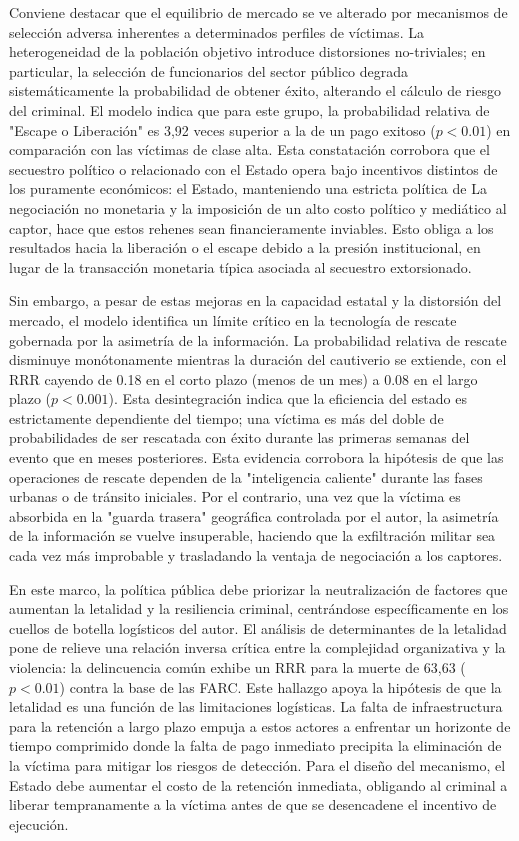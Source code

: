 \documentclass[12pt]{article}
\theoremstyle{definition}
\theoremstyle{remark}
\newcommand{\1}{\mathbf{1}}
\begin{document}
Conviene destacar que el equilibrio de mercado se ve alterado por mecanismos de selección adversa inherentes a determinados perfiles de víctimas. La heterogeneidad de la población objetivo introduce distorsiones no-triviales; en particular, la selección de funcionarios del sector público degrada sistemáticamente la probabilidad de obtener éxito, alterando el cálculo de riesgo del criminal. El modelo indica que para este grupo, la probabilidad relativa de "Escape o Liberación" es 3,92 veces superior a la de un pago exitoso ($p<0.01$) en comparación con las víctimas de clase alta. Esta constatación corrobora que el secuestro político o relacionado con el Estado opera bajo incentivos distintos de los puramente económicos: el Estado, manteniendo una estricta política de La negociación no monetaria y la imposición de un alto costo político y mediático al captor, hace que estos rehenes sean financieramente inviables. Esto obliga a los resultados hacia la liberación o el escape debido a la presión institucional, en lugar de la transacción monetaria típica asociada al secuestro extorsionado.

Sin embargo, a pesar de estas mejoras en la capacidad estatal y la distorsión del mercado, el modelo identifica un límite crítico en la tecnología de rescate gobernada por la asimetría de la información. La probabilidad relativa de rescate disminuye monótonamente mientras la duración del cautiverio se extiende, con el RRR cayendo de 0.18 en el corto plazo (menos de un mes) a 0.08 en el largo plazo ($p<0.001$). Esta desintegración indica que la eficiencia del estado es estrictamente dependiente del tiempo; una víctima es más del doble de probabilidades de ser rescatada con éxito durante las primeras semanas del evento que en meses posteriores. Esta evidencia corrobora la hipótesis de que las operaciones de rescate dependen de la "inteligencia caliente" durante las fases urbanas o de tránsito iniciales. Por el contrario, una vez que la víctima es absorbida en la "guarda trasera" geográfica controlada por el autor, la asimetría de la información se vuelve insuperable, haciendo que la exfiltración militar sea cada vez más improbable y trasladando la ventaja de negociación a los captores.

En este marco, la política pública debe priorizar la neutralización de factores que aumentan la letalidad y la resiliencia criminal, centrándose específicamente en los cuellos de botella logísticos del autor. El análisis de determinantes de la letalidad pone de relieve una relación inversa crítica entre la complejidad organizativa y la violencia: la delincuencia común exhibe un RRR para la muerte de 63,63 ($p<0.01$) contra la base de las FARC. Este hallazgo apoya la hipótesis de que la letalidad es una función de las limitaciones logísticas. La falta de infraestructura para la retención a largo plazo empuja a estos actores a enfrentar un horizonte de tiempo comprimido donde la falta de pago inmediato precipita la eliminación de la víctima para mitigar los riesgos de detección. Para el diseño del mecanismo, el Estado debe aumentar el costo de la retención inmediata, obligando al criminal a liberar tempranamente a la víctima antes de que se desencadene el incentivo de ejecución.
\end{document}

